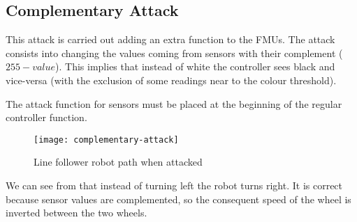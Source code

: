 \subsection{Complementary Attack}

This attack is carried out adding an extra function to the 
FMUs. The attack consists into changing the values coming from sensors with
their complement (\(255 - value\)). This implies that instead of white the
controller sees black and vice-versa (with the exclusion of some readings near
to the colour threshold).



The attack function for sensors must be placed at the beginning of the regular
controller  function.

\begin{figure}[htb]
	\centering
	\texttt{[image: complementary-attack]}
	\caption{Line follower robot path when
	attacked}\label{fig:complatkresult}
\end{figure}

We can see from  that instead of turning left the
robot turns right. It is correct because sensor values are complemented, so the
consequent speed of the wheel is inverted between the two wheels.
